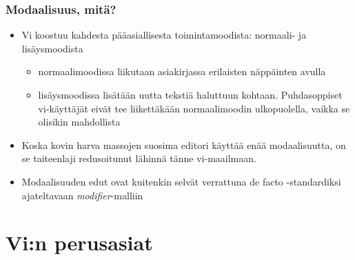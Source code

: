 \documentclass[]{beamer}
\begin{document}
\begin{frame}
    \frametitle{Modaalisuus, mitä?}
    \begin{itemize}
        \item Vi koostuu kahdesta pääasiallisesta toimintamoodista: normaali- ja lisäysmoodista
        \pause
        \begin{itemize}
            \item <+-| alert@+> normaalimoodissa liikutaan asiakirjassa erilaisten näppäinten avulla
            \item <+-| alert@+> lisäysmoodissa lisätään uutta tekstiä haluttuun kohtaan. Puhdasoppiset vi-käyttäjät eivät tee liikettäkään normaalimoodin ulkopuolella, vaikka se olisikin mahdollista
        \end{itemize}
        \pause
        \item Koska kovin harva massojen suosima editori käyttää enää modaalisuutta, on se taiteenlaji redusoitunut lähinnä tänne vi-maailmaan. 
        \pause
        \item Modaalisuuden edut ovat kuitenkin selvät verrattuna de facto -standardiksi ajateltavaan \emph{modifier}-malliin
    \end{itemize}
\end{frame}


\section {Vi:n perusasiat}
\end{document}
